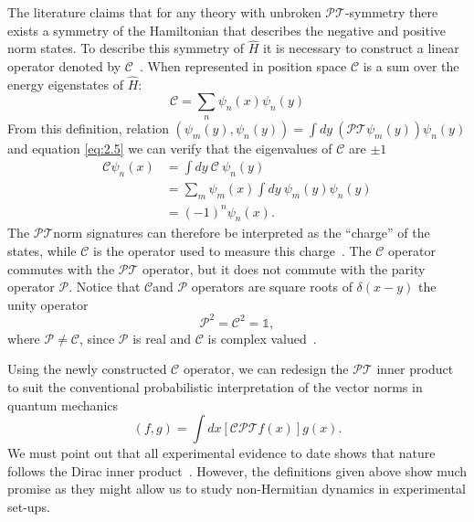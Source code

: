 \documentclass[12pt, a4paper]{report}
\newcommand\PT{\(\mathcal{PT}\)}
\newcommand\PP{\(\mathcal{P}\)}
\newcommand\CC{\(\mathcal{C}\)}
\begin{document}
The literature claims that for any theory with unbroken \PT-symmetry there exists a symmetry of the Hamiltonian that describes the negative and positive norm states. To describe this symmetry of $\hat{H}$ it is necessary to construct a linear operator denoted by \CC~\cite{MustaHbeHermitian,ComplexExtension,Bender_2004}. When represented in position space \CC\: is a sum over the energy eigenstates of $\hat{H}$:
\begin{equation}\label{eq:2.7}
\mathcal{C} = \sum_n \psi_n(x)\psi_n(y)
\end{equation}
From this definition, relation $(\psi_m(y), \psi_n(y)) = \int dy\:(\mathcal{PT}\psi_m(y))\psi_n(y)$ and equation \ref{eq:2.5} we can verify that the eigenvalues of \CC\: are $\pm 1$
\begin{align}\label{eq:2.8}
\mathcal{C} \psi_n(x) & = \int dy\:\mathcal{C}\:\psi_n(y)\nonumber \\
& = \sum_{m}\psi_m(x)\int dy\:\psi_m(y) \psi_n(y)\nonumber \\
& = (-1)^n \psi_n(x).
\end{align}
The \PT\:norm signatures can therefore be interpreted as the ``charge'' of the states, while \CC\: is the operator used to measure this charge~\cite{Bender_2004}. The \CC\: operator commutes with the \PT\: operator, but it does not commute with the parity operator \PP. Notice that \CC\:and \PP\: operators are square roots of $\delta(x-y)$ the unity operator~\cite{ComplexExtension}
\begin{equation}\label{eq:2.9}
\mathcal{P}^2 = \mathcal{C}^2 = \mathds{1}, 
\end{equation}
where $\mathcal{P} \neq \mathcal{C}$, since \PP\: is real and \CC\: is complex valued~\cite{MustaHbeHermitian, Bender_2004}.

Using the newly constructed \CC\: operator, we can redesign the \PT\: inner product to suit the conventional probabilistic interpretation of the vector norms in quantum mechanics
\begin{equation}\label{eq:2.10}
\left( f, g \right ) = \int dx \left [ \mathcal{CPT} f(x) \right ] g(x).
\end{equation}
We must point out that all experimental evidence to date shows that nature follows the Dirac inner product~\cite{Maximal}. However, the definitions given above show much promise as they might allow us to study non-Hermitian dynamics in experimental set-ups.

\end{document}
